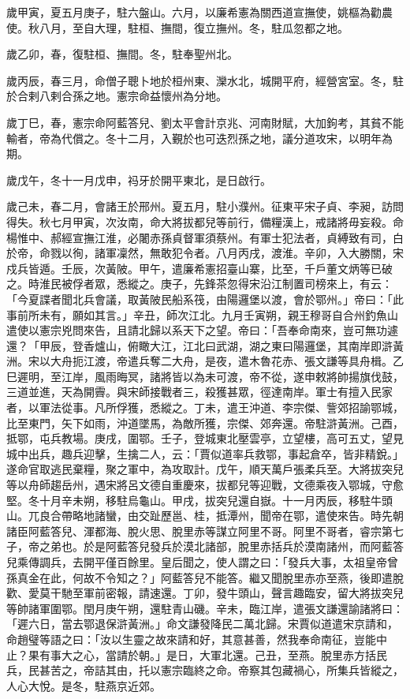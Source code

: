 \begin{pinyinscope}
 歲甲寅，夏五月庚子，駐六盤山。六月，以廉希憲為關西道宣撫使，姚樞為勸農使。秋八月，至自大理，駐桓、撫間，復立撫州。冬，駐瓜忽都之地。



 歲乙卯，春，復駐桓、撫間。冬，駐奉聖州北。



 歲丙辰，春三月，命僧子聰卜地於桓州東、灤水北，城開平府，經營宮室。冬，駐於合剌八剌合孫之地。憲宗命益懷州為分地。



 歲丁巳，春，憲宗命阿藍答兒、劉太平會計京兆、河南財賦，大加鉤考，其貧不能輸者，帝為代償之。冬十二月，入覲於也可迭烈孫之地，議分道攻宋，以明年為期。



 歲戊午，冬十一月戊申，祃牙於開平東北，是日啟行。



 歲己未，春二月，會諸王於邢州。夏五月，駐小濮州。征東平宋子貞、李昶，訪問得失。秋七月甲寅，次汝南，命大將拔都兒等前行，備糧漢上，戒諸將毋妄殺。命楊惟中、郝經宣撫江淮，必闍赤孫貞督軍須蔡州。有軍士犯法者，貞縛致有司，白於帝，命戮以徇，諸軍凜然，無敢犯令者。八月丙戌，渡淮。辛卯，入大勝關，宋戍兵皆遁。壬辰，次黃陂。甲午，遣廉希憲招臺山寨，比至，千戶董文炳等已破之。時淮民被俘者眾，悉縱之。庚子，先鋒茶忽得宋沿江制置司榜來上，有云：「今夏諜者聞北兵會議，取黃陂民船系筏，由陽邏堡以渡，會於鄂州。」帝曰：「此事前所未有，願如其言。」辛丑，師次江北。九月壬寅朔，親王穆哥自合州釣魚山遣使以憲宗兇問來告，且請北歸以系天下之望。帝曰：「吾奉命南來，豈可無功遽還？「甲辰，登香爐山，俯瞰大江，江北曰武湖，湖之東曰陽邏堡，其南岸即滸黃洲。宋以大舟扼江渡，帝遣兵奪二大舟，是夜，遣木魯花赤、張文謙等具舟楫。乙巳遲明，至江岸，風雨晦冥，諸將皆以為未可渡，帝不從，遂申敕將帥揚旗伐鼓，三道並進，天為開霽。與宋師接戰者三，殺獲甚眾，徑達南岸。軍士有擅入民家者，以軍法從事。凡所俘獲，悉縱之。丁未，遣王沖道、李宗傑、訾郊招諭鄂城，比至東門，矢下如雨，沖道墜馬，為敵所獲，宗傑、郊奔還。帝駐滸黃洲。己酉，抵鄂，屯兵教場。庚戌，圍鄂。壬子，登城東北壓雲亭，立望樓，高可五丈，望見城中出兵，趣兵迎擊，生擒二人，云：「賈似道率兵救鄂，事起倉卒，皆非精銳。」遂命官取逃民棄糧，聚之軍中，為攻取計。戊午，順天萬戶張柔兵至。大將拔突兒等以舟師趨岳州，遇宋將呂文德自重慶來，拔都兒等迎戰，文德乘夜入鄂城，守愈堅。冬十月辛未朔，移駐烏龜山。甲戌，拔突兒還自嶽。十一月丙辰，移駐牛頭山。兀良合帶略地諸蠻，由交趾歷邕、桂，抵潭州，聞帝在鄂，遣使來告。時先朝諸臣阿藍答兒、渾都海、脫火思、脫里赤等謀立阿里不哥。阿里不哥者，睿宗第七子，帝之弟也。於是阿藍答兒發兵於漠北諸部，脫里赤括兵於漠南諸州，而阿藍答兒乘傳調兵，去開平僅百餘里。皇后聞之，使人謂之曰：「發兵大事，太祖皇帝曾孫真金在此，何故不令知之？」阿藍答兒不能答。繼又聞脫里赤亦至燕，後即遣脫歡、愛莫干馳至軍前密報，請速還。丁卯，發牛頭山，聲言趣臨安，留大將拔突兒等帥諸軍圍鄂。閏月庚午朔，還駐青山磯。辛未，臨江岸，遣張文謙還諭諸將曰：「遲六日，當去鄂退保滸黃洲。」命文謙發降民二萬北歸。宋賈似道遣宋京請和，命趙璧等語之曰：「汝以生靈之故來請和好，其意甚善，然我奉命南征，豈能中止？果有事大之心，當請於朝。」是日，大軍北還。己丑，至燕。脫里赤方括民兵，民甚苦之，帝詰其由，托以憲宗臨終之命。帝察其包藏禍心，所集兵皆縱之，人心大悅。是冬，駐燕京近郊。




\end{pinyinscope}
